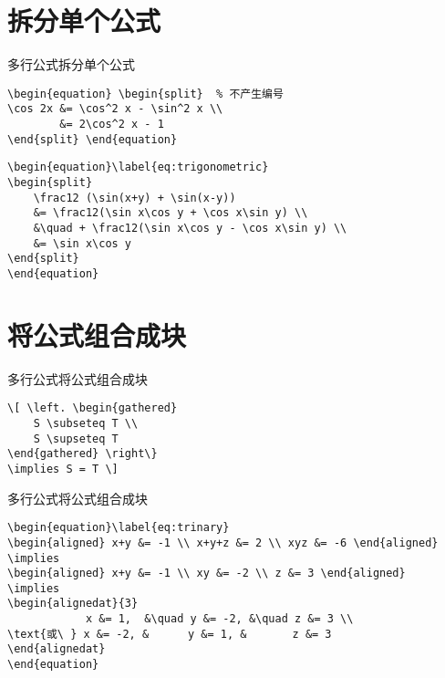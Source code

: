 \documentclass[11pt]{beamer}
\begin{document}
\section{拆分单个公式}

\begin{frame}[fragile]{多行公式}{拆分单个公式}
\begin{lstlisting}
\begin{equation} \begin{split}  % 不产生编号
\cos 2x &= \cos^2 x - \sin^2 x \\
		&= 2\cos^2 x - 1
\end{split} \end{equation}
\end{lstlisting}
\begin{lstlisting}
\begin{equation}\label{eq:trigonometric}
\begin{split}
	\frac12 (\sin(x+y) + \sin(x-y))
	&= \frac12(\sin x\cos y + \cos x\sin y) \\
	&\quad + \frac12(\sin x\cos y - \cos x\sin y) \\
	&= \sin x\cos y
\end{split}
\end{equation}
\end{lstlisting}
\end{frame}

\section{将公式组合成块}

\begin{frame}[fragile]{多行公式}{将公式组合成块}
\begin{lstlisting}
\[ \left. \begin{gathered}
	S \subseteq T \\
	S \supseteq T
\end{gathered} \right\}
\implies S = T \]
\end{lstlisting}
\end{frame}
\begin{frame}[fragile]{多行公式}{将公式组合成块}
\begin{lstlisting}
\begin{equation}\label{eq:trinary}
\begin{aligned} x+y &= -1 \\ x+y+z &= 2 \\ xyz &= -6 \end{aligned}
\implies
\begin{aligned} x+y &= -1 \\ xy &= -2 \\ z &= 3 \end{aligned}
\implies
\begin{alignedat}{3}
		    x &= 1,  &\quad y &= -2, &\quad z &= 3 \\
\text{或\ } x &= -2, &      y &= 1, &       z &= 3
\end{alignedat}
\end{equation}
\end{lstlisting}
\end{frame}
\end{document}
